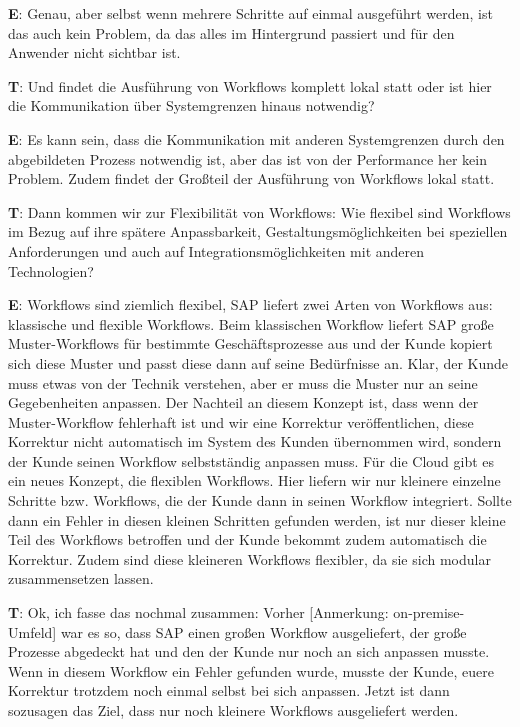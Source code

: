 \begin{list}{X:}{\setlength{\labelsep}{5mm}}
    \item[\textbf{E}:] Genau, aber selbst wenn mehrere Schritte auf einmal ausgeführt werden, ist das auch kein Problem, da das alles im Hintergrund passiert und für den Anwender nicht sichtbar ist.
    \item[\textbf{T}:] Und findet die Ausführung von Workflows komplett lokal statt oder ist hier die Kommunikation über Systemgrenzen hinaus notwendig?
    \item[\textbf{E}:] Es kann sein, dass die Kommunikation mit anderen Systemgrenzen durch den abgebildeten Prozess notwendig ist, aber das ist von der Performance her kein Problem. Zudem findet der Großteil der Ausführung von Workflows lokal statt.
    \item[\textbf{T}:] Dann kommen wir zur Flexibilität von Workflows: Wie flexibel sind Workflows im Bezug auf ihre spätere Anpassbarkeit, Gestaltungsmöglichkeiten bei speziellen Anforderungen und auch auf Integrationsmöglichkeiten mit anderen Technologien?
    \item[\textbf{E}:] Workflows sind ziemlich flexibel, SAP liefert zwei Arten von Workflows aus: klassische und flexible Workflows. Beim klassischen Workflow liefert SAP gro{\ss}e Muster-Workflows für bestimmte Geschäftsprozesse aus und der Kunde kopiert sich diese Muster und passt diese dann auf seine Bedürfnisse an. Klar, der Kunde muss etwas von der Technik verstehen, aber er muss die Muster nur an seine Gegebenheiten anpassen. Der Nachteil an diesem Konzept ist, dass wenn der Muster-Workflow fehlerhaft ist und wir eine Korrektur veröffentlichen, diese Korrektur nicht automatisch im System des Kunden übernommen wird, sondern der Kunde seinen Workflow selbstständig anpassen muss. Für die Cloud gibt es ein neues Konzept, die flexiblen Workflows. Hier liefern wir nur kleinere einzelne Schritte bzw. Workflows, die der Kunde dann in seinen Workflow integriert. Sollte dann ein Fehler in diesen kleinen Schritten gefunden werden, ist nur dieser kleine Teil des Workflows betroffen und der Kunde bekommt zudem automatisch die Korrektur. Zudem sind diese kleineren Workflows flexibler, da sie sich modular zusammensetzen lassen.
    \item[\textbf{T}:] Ok, ich fasse das nochmal zusammen: Vorher [Anmerkung: on-premise-Umfeld] war es so, dass SAP einen gro{\ss}en Workflow ausgeliefert, der gro{\ss}e Prozesse abgedeckt hat und den der Kunde nur noch an sich anpassen musste. Wenn in diesem Workflow ein Fehler gefunden wurde, musste der Kunde, euere Korrektur trotzdem noch einmal selbst bei sich anpassen. Jetzt ist dann sozusagen das Ziel, dass nur noch kleinere Workflows ausgeliefert werden.

\end{list}
